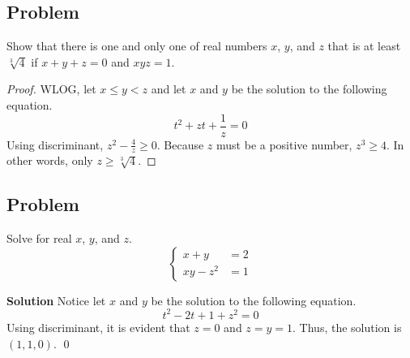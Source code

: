 \documentclass{article}
\newenvironment{solution}{\begin{trivlist}\item[]{\bf Solution}}{\qed \end{trivlist}}
\begin{document}
\subsection*{Problem}
Show that there is one and only one of real numbers
$x$, $y$, and $z$ that is at least $\sqrt[3]{4}$ if
$x + y + z = 0$ and $xyz = 1$.
\begin{proof}
WLOG, let $x \leq y < z$ and let $x$ and $y$ be the
solution to the following equation.
\[
t^2 + zt + \frac{1}{z} = 0
\]
Using discriminant, $z^2 - \frac{4}{z} \geq 0$.
Because $z$ must be a positive number, $z^3 \geq 4$.
In other words, only $z \geq \sqrt[3]{4}$.
\end{proof}

\subsection*{Problem}
Solve for real $x$, $y$, and $z$.
\[
\begin{cases}
    x + y &= 2 \\
    xy - z^2 &= 1
\end{cases}
\]
\begin{solution}
Notice let $x$ and $y$ be the solution to the
following equation.
\[
t^2 - 2t + 1 + z^2 = 0
\]
Using discriminant, it is evident that $z = 0$ and
$z = y = 1$. Thus, the solution is $\boxed{(1, 1, 0)}$.
\end{solution}
\end{document}
